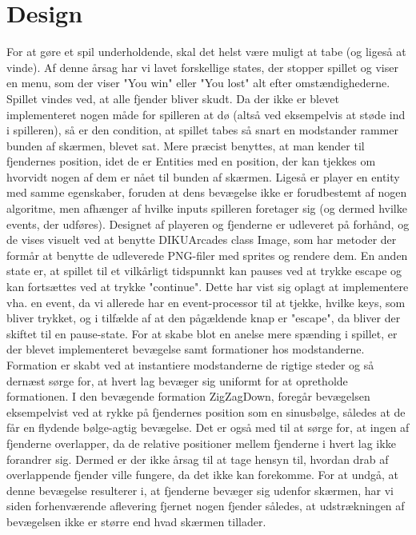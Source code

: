 \section{Design}

For at gøre et spil underholdende, skal det helst være muligt at tabe (og ligeså at vinde). Af denne årsag har vi lavet forskellige states, der stopper spillet og viser en menu, som der viser "You win" eller "You lost" alt efter omstændighederne. Spillet vindes ved, at alle fjender bliver skudt.
Da der ikke er blevet implementeret nogen måde for spilleren at dø (altså ved eksempelvis at støde ind i spilleren), så er den condition, at spillet tabes så snart en modstander rammer bunden af skærmen, blevet sat. Mere præcist benyttes, at man kender til fjendernes position, idet de er Entities med en position, der kan tjekkes om hvorvidt nogen af dem er nået til bunden af skærmen. Ligeså er player en entity med samme egenskaber, foruden at dens bevægelse ikke er forudbestemt af nogen algoritme, men afhænger af hvilke inputs spilleren foretager sig (og dermed hvilke events, der udføres).
Designet af playeren og fjenderne er udleveret på forhånd, og de vises visuelt ved at benytte DIKUArcades class Image, som har metoder der formår at benytte de udleverede PNG-filer med sprites og rendere dem. 
En anden state er, at spillet til et vilkårligt tidspunnkt kan pauses ved at trykke escape og kan fortsættes ved at trykke "continue". Dette har vist sig oplagt at implementere vha. en event, da vi allerede har en event-processor til at tjekke, hvilke keys, som bliver trykket, og i tilfælde af at den pågældende knap er "escape", da bliver der skiftet til en pause-state.
For at skabe blot en anelse mere spænding i spillet, er der blevet implementeret bevægelse samt formationer hos modstanderne. Formation er skabt ved at instantiere modstanderne de rigtige steder og så dernæst sørge for, at hvert lag bevæger sig uniformt for at opretholde formationen. I den bevægende formation ZigZagDown, foregår bevægelsen eksempelvist ved at rykke på fjendernes position som en sinusbølge, således at de får en flydende bølge-agtig bevægelse. Det er også med til at sørge for, at ingen af fjenderne overlapper, da de relative positioner mellem fjenderne i hvert lag ikke forandrer sig. Dermed er der ikke årsag til at tage hensyn til, hvordan drab af overlappende fjender ville fungere, da det ikke kan forekomme.
For at undgå, at denne bevægelse resulterer i, at fjenderne bevæger sig udenfor skærmen, har vi siden forhenværende aflevering fjernet nogen fjender således, at udstrækningen af bevægelsen ikke er større end hvad skærmen tillader.
